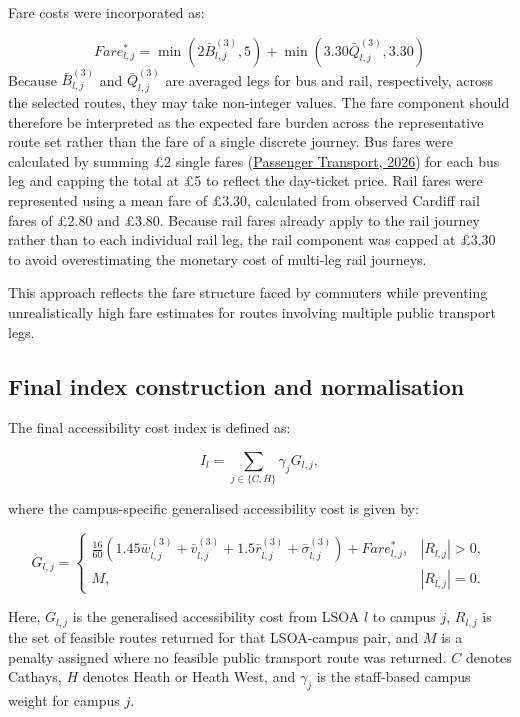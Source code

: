 \documentclass[11pt,a4paper]{article}
\newcommand{\hcite}[2]{\hyperlink{#1}{#2}}
\newcommand{\hcite}[2]{\hyperlink{#1}{#2}}
\begin{document}
Fare costs were incorporated as:

\[
Fare_{l,j}^*
=
\min \left(2\bar{B}_{l,j}^{(3)}, 5\right)
+
\min \left(3.30\bar{Q}_{l,j}^{(3)}, 3.30\right)
\]
Because \(\bar{B}_{l,j}^{(3)}\) and \(\bar{Q}_{l,j}^{(3)}\) are averaged legs for bus and rail, respectively, across the selected routes, they may take non-integer values. The fare component should therefore be interpreted as the expected fare burden across the representative route set rather than the fare of a single discrete journey. Bus fares were calculated by summing \pounds2 single fares (\hcite{passengertransport2026}{Passenger Transport, 2026}) for each bus leg and capping the total at \pounds5 to reflect the day-ticket price. Rail fares were represented using a mean fare of \pounds3.30, calculated from observed Cardiff rail fares of \pounds2.80 and \pounds3.80. Because rail fares already apply to the rail journey rather than to each individual rail leg, the rail component was capped at \pounds3.30 to avoid overestimating the monetary cost of multi-leg rail journeys.

This approach reflects the fare structure faced by commuters while preventing unrealistically high fare estimates for routes involving multiple public transport legs.


\subsection{Final index construction and normalisation}

The final accessibility cost index is defined as:

\[
I_l = \sum_{j \in \{C,H\}} \gamma_j G_{l,j},
\]

where the campus-specific generalised accessibility cost is given by:

\[
G_{l,j} =
\begin{cases}
\displaystyle
\frac{16}{60}
\left(
1.45\bar{w}^{(3)}_{l,j}
+
\bar{v}^{(3)}_{l,j}
+
1.5\bar{r}^{(3)}_{l,j}
+
\bar{\sigma}^{(3)}_{l,j}
\right)
+
Fare^{*}_{l,j},
& |R_{l,j}| > 0, \\[1.2em]
M, & |R_{l,j}| = 0.
\end{cases}
\]

Here, \(G_{l,j}\) is the generalised accessibility cost from LSOA \(l\) to campus \(j\), \(R_{l,j}\) is the set of feasible routes returned for that LSOA-campus pair, and \(M\) is a penalty assigned where no feasible public transport route was returned. \(C\) denotes Cathays, \(H\) denotes Heath or Heath West, and \(\gamma_j\) is the staff-based campus weight for campus \(j\).
\end{document}
